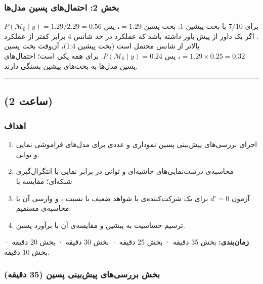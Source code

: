 \subsubsection{بخش 2: احتمال‌های پسین مدل‌ها}

برای 7/10 با بخت پیشین 1: بخت پسین \(= 1.29\)، پس
\(P(\mathcal{M}_0 \mid y) = 1.29 / 2.29 = 0.56\). اگر یک داور از پیش
باور داشته باشد که عملکرد در حد شانس 4 برابر کمتر از عملکرد بالاتر از
شانس محتمل است (بخت پیشین 1:4)، آن‌وقت بخت پسین
\(= 1.29 \times 0.25 = 0.32\)، پس \(P(\mathcal{M}_0 \mid y) = 0.24\).
 برای همه یکی است؛ احتمال‌های پسین مدل‌ها به بخت‌های پیشین
بستگی دارند.

\begin{center}\rule{0.5\linewidth}{0.5pt}\end{center}


\subsection{\texorpdfstring{ (2 ساعت)}{lab (2 ساعت)}}

\subsubsection{اهداف}

\begin{enumerate}
\def\labelenumi{\arabic{enumi}.}
\tightlist
\item
  اجرای بررسی‌های پیش‌بینی پسین نموداری و عددی برای مدل‌های فراموشی نمایی و
  توانی.
\item
  محاسبه‌ی درست‌نمایی‌های حاشیه‌ای و  توانی در برابر نمایی
  با انتگرال‌گیری شبکه‌ای؛ مقایسه با 
\item
  آزمون \(d' = 0\) برای یک شرکت‌کننده‌ی  با شواهد ضعیف با نسبت
  ، و وارسی آن با محاسبه‌ی مستقیم.
\item
  ترسیم حساسیت  به پیشین و مقایسه‌ی آن با برآورد پسین.
\end{enumerate}

\textbf{زمان‌بندی:} بخش  35 دقیقه · بخش  25 دقیقه · بخش
 30 دقیقه · بخش  20 دقیقه · بخش  10 دقیقه.

\subsubsection{\texorpdfstring{بخش  بررسی‌های پیش‌بینی پسین (35
دقیقه)}{بخش A: بررسی‌های پیش‌بینی پسین (35 دقیقه)}}

